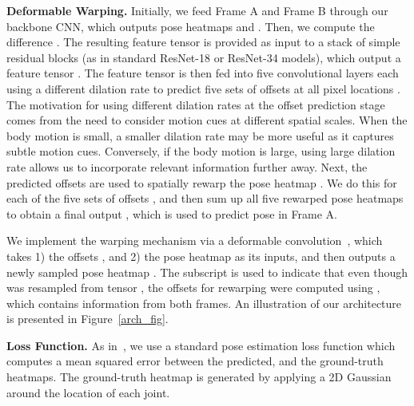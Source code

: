 \documentclass{article}
\begin{document}
\textbf{Deformable Warping.} Initially, we feed Frame A and Frame B through our backbone CNN, which outputs pose heatmaps \smash{} and \smash{}. Then, we compute the difference \smash{}. The resulting feature tensor \smash{} is provided as input to a stack of  simple residual blocks (as in standard ResNet-18 or ResNet-34 models), which output a feature tensor \smash{}. The feature tensor  \smash{} is then fed into five  convolutional layers each using a different dilation rate  to predict five sets of offsets  at all pixel locations . The motivation for using different dilation rates at the offset prediction stage comes from the need to consider motion cues at different spatial scales. When the body motion is small, a smaller dilation rate may be more useful as it captures subtle motion cues. Conversely, if the body motion is large, using large dilation rate allows us to incorporate relevant information further away. Next, the predicted offsets are used to spatially rewarp the pose heatmap . We do this for each of the five sets of offsets , and then sum up all five rewarped pose heatmaps to obtain a final output \smash{}, which is used to predict pose in Frame A.




We implement the warping mechanism via a deformable convolution~\cite{8237351}, which takes 1) the offsets , and 2) the pose heatmap  as its inputs, and then outputs a newly sampled pose heatmap \smash{}.  The subscript  is used to indicate that even though  \smash{} was resampled from tensor \smash{}, the offsets for rewarping were computed using \smash{}, which contains information from both frames. An illustration of our architecture is presented in Figure~\ref{arch_fig}.








\textbf{Loss Function.} As in~\cite{sun2019deep}, we use a standard pose estimation loss function which computes a mean squared error between the predicted, and the ground-truth heatmaps. The ground-truth heatmap is generated by applying a 2D Gaussian around the location of each joint.
\end{document}
